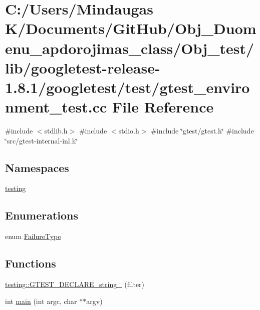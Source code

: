 \hypertarget{_obj__test_2lib_2googletest-release-1_88_81_2googletest_2test_2gtest__environment__test_8cc}{}\section{C\+:/\+Users/\+Mindaugas K/\+Documents/\+Git\+Hub/\+Obj\+\_\+\+Duomenu\+\_\+apdorojimas\+\_\+class/\+Obj\+\_\+test/lib/googletest-\/release-\/1.8.1/googletest/test/gtest\+\_\+environment\+\_\+test.cc File Reference}
\label{_obj__test_2lib_2googletest-release-1_88_81_2googletest_2test_2gtest__environment__test_8cc}
{\ttfamily \#include $<$stdlib.\+h$>$}\newline
{\ttfamily \#include $<$stdio.\+h$>$}\newline
{\ttfamily \#include \char`\"{}gtest/gtest.\+h\char`\"{}}\newline
{\ttfamily \#include \char`\"{}src/gtest-\/internal-\/inl.\+h\char`\"{}}\newline
\subsection*{Namespaces}
\begin{DoxyCompactItemize}
\item 
 \mbox{\hyperlink{namespacetesting}{testing}}
\end{DoxyCompactItemize}
\subsection*{Enumerations}
\begin{DoxyCompactItemize}
\item 
enum \mbox{\hyperlink{_obj__test_2lib_2googletest-release-1_88_81_2googletest_2test_2gtest__environment__test_8cc_aa43ad7e2c1c5c5150ba8d95607a96263}{Failure\+Type}} 
\end{DoxyCompactItemize}
\subsection*{Functions}
\begin{DoxyCompactItemize}
\item 
\mbox{\hyperlink{namespacetesting_a20d69860ce843142c7f740262e6b0c9a}{testing\+::\+G\+T\+E\+S\+T\+\_\+\+D\+E\+C\+L\+A\+R\+E\+\_\+string\+\_\+}} (filter)
\item 
int \mbox{\hyperlink{_obj__test_2lib_2googletest-release-1_88_81_2googletest_2test_2gtest__environment__test_8cc_a3c04138a5bfe5d72780bb7e82a18e627}{main}} (int argc, char $\ast$$\ast$argv)
\end{DoxyCompactItemize}


